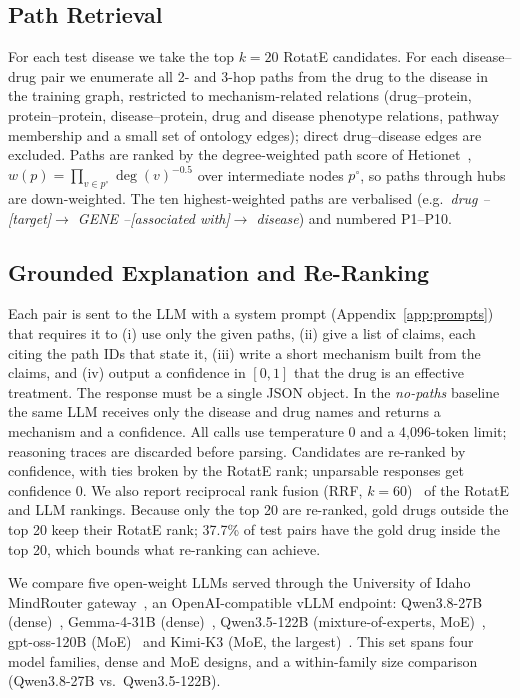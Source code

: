 \documentclass[electronics,article,submit]{Definitions/mdpi}
\begin{document}
\subsection{Path Retrieval}
For each test disease we take the top $k=20$ RotatE candidates. For each disease--drug pair we enumerate all 2- and 3-hop paths from the drug to the disease in the training graph, restricted to mechanism-related relations (drug--protein, protein--protein, disease--protein, drug and disease phenotype relations, pathway membership and a small set of ontology edges); direct drug--disease edges are excluded. Paths are ranked by the degree-weighted path score of Hetionet~\cite{himmelstein2017hetionet}, $w(p)=\prod_{v\in p^{\circ}} \deg(v)^{-0.5}$ over intermediate nodes $p^{\circ}$, so paths through hubs are down-weighted. The ten highest-weighted paths are verbalised (e.g.\ \textit{drug --[target]$\to$ GENE --[associated with]$\to$ disease}) and numbered P1--P10.

\subsection{Grounded Explanation and Re-Ranking}
Each pair is sent to the LLM with a system prompt (Appendix~\ref{app:prompts}) that requires it to (i) use only the given paths, (ii) give a list of claims, each citing the path IDs that state it, (iii) write a short mechanism built from the claims, and (iv) output a confidence in $[0,1]$ that the drug is an effective treatment. The response must be a single JSON object. In the \emph{no-paths} baseline the same LLM receives only the disease and drug names and returns a mechanism and a confidence. All calls use temperature 0 and a 4,096-token limit; reasoning traces are discarded before parsing. Candidates are re-ranked by confidence, with ties broken by the RotatE rank; unparsable responses get confidence 0. We also report reciprocal rank fusion (RRF, $k=60$)~\cite{cormack2009rrf} of the RotatE and LLM rankings. Because only the top 20 are re-ranked, gold drugs outside the top 20 keep their RotatE rank; 37.7\% of test pairs have the gold drug inside the top 20, which bounds what re-ranking can achieve.

We compare five open-weight LLMs served through the University of Idaho MindRouter gateway~\cite{sheneman2026mindrouter}, an OpenAI-compatible vLLM endpoint: Qwen3.8-27B (dense)~\cite{qwen2026qwen38}, Gemma-4-31B (dense)~\cite{gemma2026gemma4}, Qwen3.5-122B (mixture-of-experts, MoE)~\cite{qwen2026qwen35}, gpt-oss-120B (MoE)~\cite{openai2025gptoss} and Kimi-K3 (MoE, the largest)~\cite{kimi2026k3}. This set spans four model families, dense and MoE designs, and a within-family size comparison (Qwen3.8-27B vs.\ Qwen3.5-122B).
\end{document}
